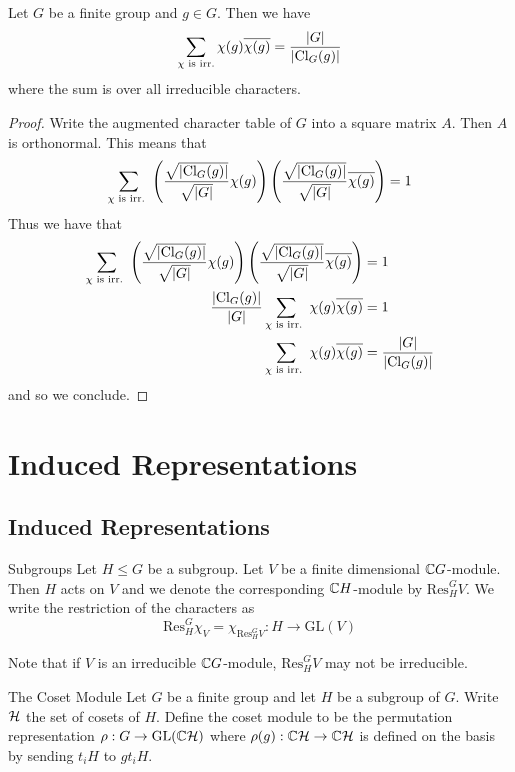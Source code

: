 \documentclass[a4paper]{article}
\begin{document}
\begin{crl}{}{} Let $G$ be a finite group and $g\in G$. Then we have $$\sum_{\chi\text{ is irr.}}\chi(g)\overline{\chi(g)}=\frac{\abs{G}}{\abs{\text{Cl}_G(g)}}$$ where the sum is over all irreducible characters. \tcbline
\begin{proof}
Write the augmented character table of $G$ into a square matrix $A$. Then $A$ is orthonormal. This means that $$\sum_{\chi\text{ is irr. }}\left(\frac{\sqrt{\abs{\text{Cl}_G(g)}}}{\sqrt{\abs{G}}}\chi(g)\right)\left(\frac{\sqrt{\abs{\text{Cl}_G(g)}}}{\sqrt{\abs{G}}}\overline{\chi(g)}\right)=1$$ Thus we have that 
\begin{align*}
\sum_{\chi\text{ is irr. }}\left(\frac{\sqrt{\abs{\text{Cl}_G(g)}}}{\sqrt{\abs{G}}}\chi(g)\right)\left(\frac{\sqrt{\abs{\text{Cl}_G(g)}}}{\sqrt{\abs{G}}}\overline{\chi(g)}\right)&=1\\
\frac{\abs{\text{Cl}_G(g)}}{\abs{G}}\sum_{\chi\text{ is irr. }}\chi(g)\overline{\chi(g)}&=1\\
\sum_{\chi\text{ is irr. }}\chi(g)\overline{\chi(g)}&=\frac{\abs{G}}{\abs{\text{Cl}_G(g)}}
\end{align*}
and so we conclude. 
\end{proof}
\end{crl}

\pagebreak
\section{Induced Representations}
\subsection{Induced Representations}
\begin{defn}{Subgroups}{} Let $H\leq G$ be a subgroup. Let $V$ be a finite dimensional $\mathbb{C} G$-module. Then $H$ acts on $V$ and we denote the corresponding $\mathbb{C} H$-module by $\text{Res}_H^GV$. We write the restriction of the characters as $$\text{Res}_H^G\chi_V=\chi_{\text{Res}_H^GV}:H\to\text{GL}(V)$$
\end{defn}

Note that if $V$ is an irreducible $\mathbb{C} G$-module, $\text{Res}_H^GV$ may not be irreducible. 

\begin{defn}{The Coset Module}{} Let $G$ be a finite group and let $H$ be a subgroup of $G$. Write $\mathcal{H}$ the set of cosets of $H$. Define the coset module to be the permutation representation $\rho:G\to\text{GL}(\mathbb{C}\mathcal{H})$ where $\rho(g):\mathbb{C}\mathcal{H}\to\mathbb{C}\mathcal{H}$ is defined on the basis by sending $t_iH$ to $gt_iH$. 
\end{defn}
\end{document}
